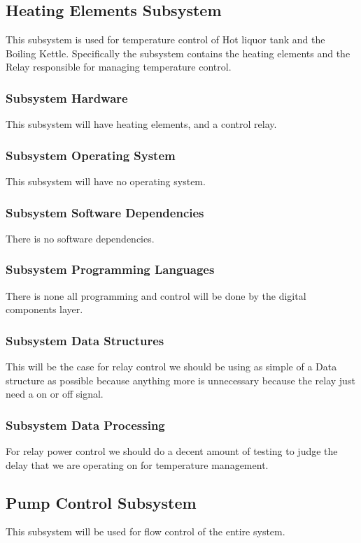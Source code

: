\subsection{Heating Elements Subsystem}
This subsystem is used for temperature control of Hot liquor tank and the Boiling Kettle. Specifically the subsystem contains the heating elements and the Relay responsible for managing temperature control.



\subsubsection{Subsystem Hardware}
This subsystem will have heating elements, and a control relay.

\subsubsection{Subsystem Operating System}
This subsystem will have no operating system.

\subsubsection{Subsystem Software Dependencies}
There is no software dependencies.

\subsubsection{Subsystem Programming Languages}
There is none all programming and control will be done by the digital components layer.

\subsubsection{Subsystem Data Structures}
This will be the case for relay control we should be using as simple of a Data structure as possible because anything more is unnecessary because the relay just need a on or off signal. 

\subsubsection{Subsystem Data Processing}
For relay power control we should do a decent amount of testing to judge the delay that we are operating on for temperature management.



\subsection{Pump Control Subsystem}
This subsystem will be used for flow control of the entire system.




